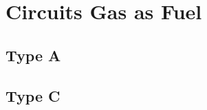 \documentclass[xcolor=dvipsnames,hyperref={breaklinks=true},mathserif,
professionalfont,12pt]{beamer}
\begin{document}
\begin{frame}
\end{frame}

\section{Circuits Gas as Fuel}

\subsection{Type A}
\begin{frame}
 
\end{frame}


\subsection{Type C}

\begin{frame}
 
\end{frame}
\end{document}
